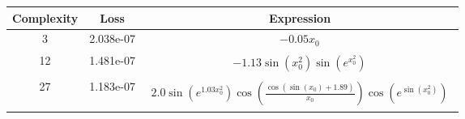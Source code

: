 \begin{center}
        \begin{tabular}{|c|c|c|}
        \hline
        Complexity & Loss & Expression \\
        \hline
        3 & 2.038e-07 & $\begin{aligned}- 0.05 x_{0}\end{aligned}$\\ \hline12 & 1.481e-07 & $\begin{aligned}- 1.13 \sin{\left(x_{0}^{2} \right)} \sin{\left(e^{x_{0}^{2}} \right)}\end{aligned}$\\ \hline27 & 1.183e-07 & $\begin{aligned}2.0 \sin{\left(e^{1.03 x_{0}^{2}} \right)} \cos{\left(\frac{\cos{\left(\sin{\left(x_{0} \right)} + 1.89 \right)}}{x_{0}} \right)} \cos{\left(e^{\sin{\left(x_{0}^{2} \right)}} \right)}\end{aligned}$\\ \hline\end{tabular}
        \end{center}
        